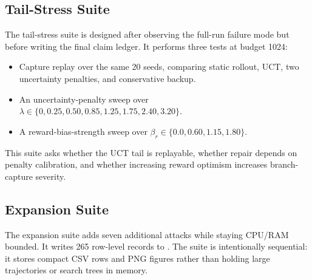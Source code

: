 \documentclass{article}
\begin{document}
\subsection{Tail-Stress Suite}

The tail-stress suite is designed after observing the full-run failure mode but before writing the final claim ledger. It performs three tests at budget 1024:
\begin{itemize}
\item Capture replay over the same 20 seeds, comparing static rollout, UCT, two uncertainty penalties, and conservative backup.
\item An uncertainty-penalty sweep over \(\lambda\in\{0,0.25,0.50,0.85,1.25,1.75,2.40,3.20\}\).
\item A reward-bias-strength sweep over \(\beta_r\in\{0.0,0.60,1.15,1.80\}\).
\end{itemize}
This suite asks whether the UCT tail is replayable, whether repair depends on penalty calibration, and whether increasing reward optimism increases branch-capture severity.

\subsection{Expansion Suite}

The expansion suite adds seven additional attacks while staying CPU/RAM bounded. It writes 265 row-level records to . The suite is intentionally sequential: it stores compact CSV rows and PNG figures rather than holding large trajectories or search trees in memory.
\end{document}
